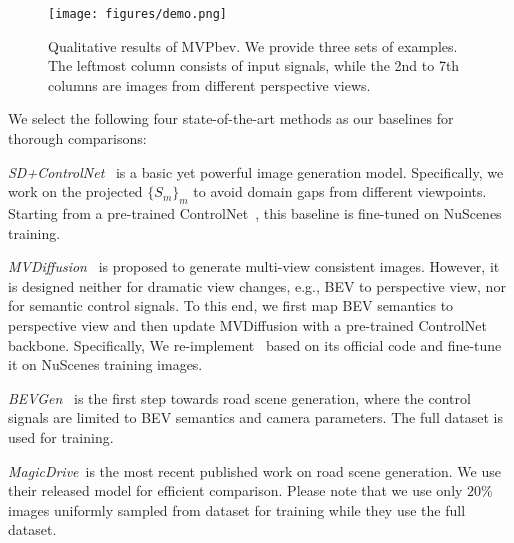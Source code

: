 \begin{figure}[t]
\centering
\texttt{[image: figures/demo.png]}
\caption{Qualitative results of MVPbev. We provide three sets of examples. The leftmost column consists of input signals, while the 2nd to 7th columns are images from different perspective views.
}
\label{fig:demo}
\end{figure}

 We select the following four state-of-the-art methods as our baselines for thorough comparisons:
\begin{packed_lefty_item}
\item \textit{SD+ControlNet}~\cite{rombach2021highresolution, zhang2023adding} is a basic yet powerful image generation model. Specifically, we work on the projected $\{S_m\}_m$ to avoid domain gaps from different viewpoints. Starting from a pre-trained ControlNet~\cite{zhang2023adding}, this baseline is fine-tuned on NuScenes training.  
\item \textit{MVDiffusion}~\cite{Tang2023mvdiffusion} is proposed to generate multi-view consistent images. %
However, it is designed neither for dramatic view changes, e.g., BEV to perspective view, nor for semantic control signals. To this end, we %
first map BEV semantics to perspective view and then update MVDiffusion with a pre-trained ControlNet~\cite{zhang2023adding} backbone. Specifically, We re-implement~\cite{Tang2023mvdiffusion} based on its official code and fine-tune it on NuScenes training images.
\item \textit{BEVGen}~\cite{swerdlow2023street} is the first step towards road scene generation, where the control signals are limited to BEV semantics and camera parameters. The full dataset is used for training. %
\item \textit{MagicDrive}~\cite{gao2023magicdrive}is the most recent published work on road scene generation. We use their released model for efficient comparison. Please note that we use only $20\%$ images uniformly sampled from dataset for training while they use the full dataset. %
\end{packed_lefty_item}


